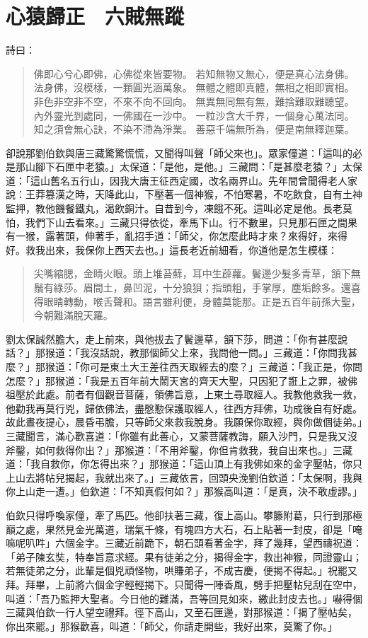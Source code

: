 
\chapter{心猿歸正　六賊無蹤}

詩曰：
\begin{quote}
佛即心兮心即佛，心佛從來皆要物。
若知無物又無心，便是真心法身佛。
法身佛，沒模樣，一顆圓光涵萬象。
無體之體即真體，無相之相即實相。
非色非空非不空，不來不向不回向。
無異無同無有無，難捨難取難聽望。
內外靈光到處同，一佛國在一沙中。
一粒沙含大千界，一個身心萬法同。
知之須會無心訣，不染不滯為淨業。
善惡千端無所為，便是南無釋迦葉。
\end{quote}

卻說那劉伯欽與唐三藏驚驚慌慌，又聞得叫聲「師父來也」。眾家僮道：「這叫的必是那山腳下石匣中老猿。」太保道：「是他，是他。」三藏問：「是甚麼老猿？」太保道：「這山舊名五行山，因我大唐王征西定國，改名兩界山。先年間曾聞得老人家說：王莽篡漢之時，天降此山，下壓著一個神猴，不怕寒暑，不吃飲食，自有土神監押，教他饑餐鐵丸，渴飲銅汁。自昔到今，凍餓不死。這叫必定是他。長老莫怕，我們下山去看來。」三藏只得依從，牽馬下山。行不數里，只見那石匣之間果有一猴，露著頭，伸著手，亂招手道：「師父，你怎麼此時才來？來得好，來得好。救我出來，我保你上西天去也。」這長老近前細看，你道他是怎生模樣：
\begin{quote}
尖嘴縮腮，金睛火眼。頭上堆苔蘚，耳中生薜蘿。鬢邊少髮多青草，頷下無鬚有綠莎。眉間土，鼻凹泥，十分狼狽；指頭粗，手掌厚，塵垢餘多。還喜得眼睛轉動，喉舌聲和。語言雖利便，身體莫能那。正是五百年前孫大聖，今朝難滿脫天羅。
\end{quote}

劉太保誠然膽大，走上前來，與他拔去了鬢邊草，頷下莎，問道：「你有甚麼說話？」那猴道：「我沒話說，教那個師父上來，我問他一問。」三藏道：「你問我甚麼？」那猴道：「你可是東土大王差往西天取經去的麼？」三藏道：「我正是，你問怎麼？」那猴道：「我是五百年前大鬧天宮的齊天大聖，只因犯了誑上之罪，被佛祖壓於此處。前者有個觀音菩薩，領佛旨意，上東土尋取經人。我教他救我一救，他勸我再莫行兇，歸依佛法，盡慇懃保護取經人，往西方拜佛，功成後自有好處。故此晝夜提心，晨昏弔膽，只等師父來救我脫身。我願保你取經，與你做個徒弟。」三藏聞言，滿心歡喜道：「你雖有此善心，又蒙菩薩教誨，願入沙門，只是我又沒斧鑿，如何救得你出？」那猴道：「不用斧鑿，你但肯救我，我自出來也。」三藏道：「我自救你，你怎得出來？」那猴道：「這山頂上有我佛如來的金字壓帖，你只上山去將帖兒揭起，我就出來了。」三藏依言，回頭央浼劉伯欽道：「太保啊，我與你上山走一遭。」伯欽道：「不知真假何如？」那猴高叫道：「是真，決不敢虛謬。」

伯欽只得呼喚家僮，牽了馬匹。他卻扶著三藏，復上高山。攀籐附葛，只行到那極巔之處，果然見金光萬道，瑞氣千條，有塊四方大石，石上貼著一封皮，卻是「唵嘛呢叭吽」六個金字。三藏近前跪下，朝石頭看著金字，拜了幾拜，望西禱祝道：「弟子陳玄奘，特奉旨意求經。果有徒弟之分，揭得金字，救出神猴，同證靈山；若無徒弟之分，此輩是個兇頑怪物，哄賺弟子，不成吉慶，便揭不得起。」祝罷又拜。拜畢，上前將六個金字輕輕揭下。只聞得一陣香風，劈手把壓帖兒刮在空中，叫道：「吾乃監押大聖者。今日他的難滿，吾等回見如來，繳此封皮去也。」嚇得個三藏與伯欽一行人望空禮拜。徑下高山，又至石匣邊，對那猴道：「揭了壓帖矣，你出來罷。」那猴歡喜，叫道：「師父，你請走開些，我好出來，莫驚了你。」

